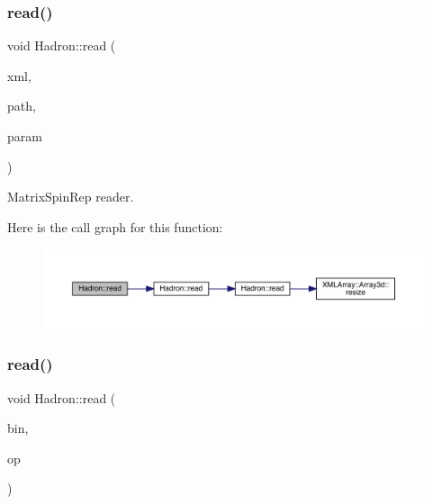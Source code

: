 \subsubsection{\texorpdfstring{read()}{read()}\hspace{0.1cm}{\footnotesize\ttfamily [18/94]}}
{\footnotesize\ttfamily void Hadron\+::read (\begin{DoxyParamCaption}\item[{\mbox{\hyperlink{classADATXML_1_1XMLReader}{X\+M\+L\+Reader}} \&}]{xml,  }\item[{const std\+::string \&}]{path,  }\item[{\mbox{\hyperlink{structHadron_1_1MatrixSpinRep__t}{Matrix\+Spin\+Rep\+\_\+t}} \&}]{param }\end{DoxyParamCaption})}



Matrix\+Spin\+Rep reader. 

Here is the call graph for this function\+:
\nopagebreak
\begin{figure}[H]
\begin{center}
\leavevmode
\includegraphics[width=350pt]{d1/daf/namespaceHadron_ad46ef728c9d609cbf63217c66bdf0285_cgraph}
\end{center}
\end{figure}
\mbox{\label{namespaceHadron_a1f04a3926b07155fbf7e7887169d7f4e}} 
\subsubsection{\texorpdfstring{read()}{read()}\hspace{0.1cm}{\footnotesize\ttfamily [19/94]}}
{\footnotesize\ttfamily void Hadron\+::read (\begin{DoxyParamCaption}\item[{\mbox{\hyperlink{classADATIO_1_1BinaryReader}{Binary\+Reader}} \&}]{bin,  }\item[{\mbox{\hyperlink{structHadron_1_1QuarkNum__t}{Quark\+Num\+\_\+t}} \&}]{op }\end{DoxyParamCaption})}



